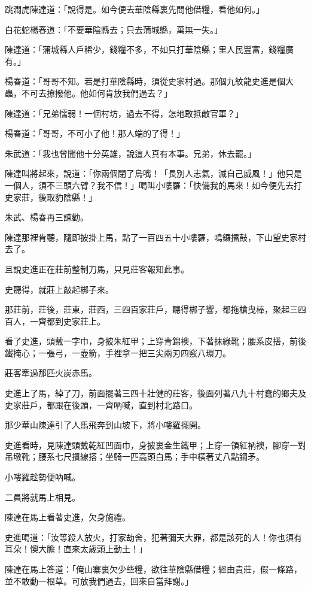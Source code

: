 \documentclass[11pt,a4paper]{article}
\begin{document}
跳澗虎陳達道：「說得是。如今便去華陰縣裏先問他借糧，看他如何。」

白花蛇楊春道：「不要華陰縣去；只去蒲城縣，萬無一失。」

陳達道：「蒲城縣人戶稀少，錢糧不多，不如只打華陰縣；里人民豐富，錢糧廣有。」

楊春道：「哥哥不知。若是打華陰縣時，須從史家村過。那個九紋龍史進是個大蟲，不可去撩撥他。他如何肯放我們過去？」

陳達道：「兄弟懦弱！一個村坊，過去不得，怎地敢抵敵官軍？」

楊春道：「哥哥，不可小了他！那人端的了得！」

朱武道：「我也曾聞他十分英雄，說這人真有本事。兄弟，休去罷。」

陳達叫將起來，說道：「你兩個閉了烏嘴！「長別人志氣，滅自己威風！」他只是一個人，須不三頭六臂？我不信！」喝叫小嘍羅：「快備我的馬來！如今便先去打史家莊，後取豹陰縣！」

朱武、楊春再三諫勸。

陳達那裡肯聽，隨即披掛上馬，點了一百四五十小嘍羅，鳴鑼擂鼓，下山望史家村去了。

且說史進正在莊前整制刀馬，只見莊客報知此事。

史聽得，就莊上敲起梆子來。

那莊前，莊後，莊東，莊西，三四百家莊戶，聽得梆子響，都拖槍曳棒，聚起三四百人，一齊都到史家莊上。

看了史進，頭戴一字巾，身披朱紅甲；上穿青錦襖，下著抹綠靴；腰系皮搭，前後鐵掩心；一張弓，一壺箭，手裡拿一把三尖兩刃四竅八環刀。

莊客牽過那匹火炭赤馬。

史進上了馬，綽了刀，前面擺著三四十壯健的莊客，後面列著八九十村蠢的鄉夫及史家莊戶，都跟在後頭，一齊吶喊，直到村北路口。

那少華山陳達引了人馬飛奔到山坡下，將小嘍羅擺開。

史進看時，見陳達頭戴乾紅凹面巾，身披裏金生鐵甲；上穿一領紅衲襖，腳穿一對吊墩靴；腰系七尺攢線搭；坐騎一匹高頭白馬；手中橫著丈八點鋼矛。

小嘍羅趁勢便吶喊。

二員將就馬上相見。

陳達在馬上看著史進，欠身施禮。

史進喝道：「汝等殺人放火，打家劫舍，犯著彌天大罪，都是該死的人！你也須有耳朵！懊大膽！直來太歲頭上動土！」

陳達在馬上答道：「俺山寨裏欠少些糧，欲往華陰縣借糧；經由貴莊，假一條路，並不敢動一根草。可放我們過去，回來自當拜謝。」
\end{document}
